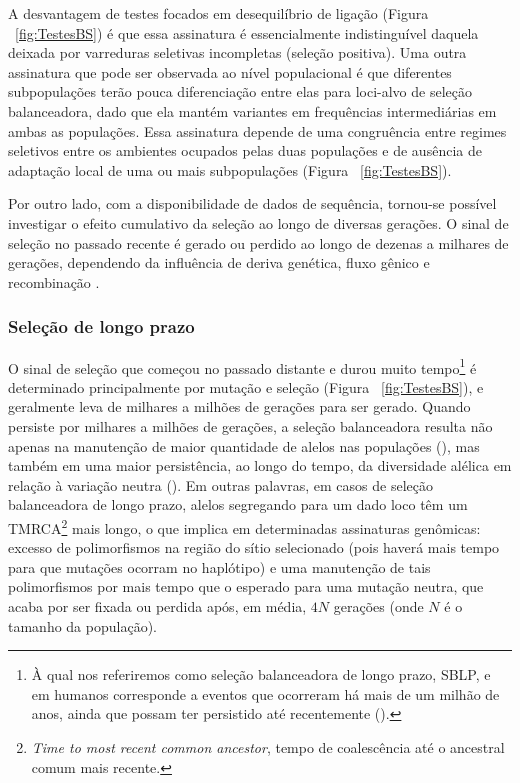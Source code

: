 \begin{refsection}
  

 
 
	A desvantagem de testes focados em desequilíbrio de ligação (Figura ~\ref{fig:TestesBS}) é que essa assinatura é essencialmente indistinguível daquela deixada por varreduras seletivas incompletas (seleção positiva). Uma outra assinatura que pode ser observada ao nível populacional é que diferentes subpopulações terão pouca diferenciação entre elas para loci-alvo de seleção balanceadora, dado que ela mantém variantes em frequências intermediárias em ambas as populações. Essa assinatura depende de uma congruência entre regimes seletivos entre os ambientes ocupados pelas duas populações e de ausência de adaptação local de uma ou mais subpopulações (Figura ~\ref{fig:TestesBS}). 
    
       Por outro lado, com a disponibilidade de dados de sequência, tornou-se possível investigar o efeito cumulativo da seleção ao longo de diversas gerações. O sinal de seleção no passado recente é gerado ou perdido ao longo de dezenas a milhares de gerações, dependendo da influência de deriva genética, fluxo gênico e recombinação \parencite{Hedrick2012}. 


\subsubsection{Seleção de longo prazo}

	O sinal de seleção que começou no passado distante e durou muito tempo\footnote{À qual nos referiremos como seleção balanceadora de longo prazo, SBLP, e em humanos corresponde a eventos que ocorreram há mais de um milhão de anos, ainda que possam ter persistido até recentemente (\cite{Fu2013}).} é determinado principalmente por mutação e seleção (Figura ~\ref{fig:TestesBS}), e geralmente leva de milhares a milhões de gerações para ser gerado. Quando persiste por milhares a milhões de gerações, a seleção balanceadora resulta não apenas na manutenção de maior quantidade de alelos nas populações (\cite{Andres2009}), mas também em uma maior persistência, ao longo do tempo, da diversidade alélica em relação à variação neutra (\cite{Richman2000}). Em outras palavras, em casos de seleção balanceadora de longo prazo, alelos segregando para um dado loco têm um TMRCA\footnote{\emph{Time to most recent common ancestor}, tempo de coalescência até o ancestral comum mais recente.} mais longo, o que implica em determinadas assinaturas genômicas: excesso de polimorfismos na região do sítio selecionado (pois haverá mais tempo para que mutações ocorram no haplótipo) e uma manutenção de tais polimorfismos por mais tempo que o esperado para uma mutação neutra, que acaba por ser fixada ou perdida após, em média, $4N$ gerações (onde $N$ é o tamanho da população).
%

\end{refsection}
